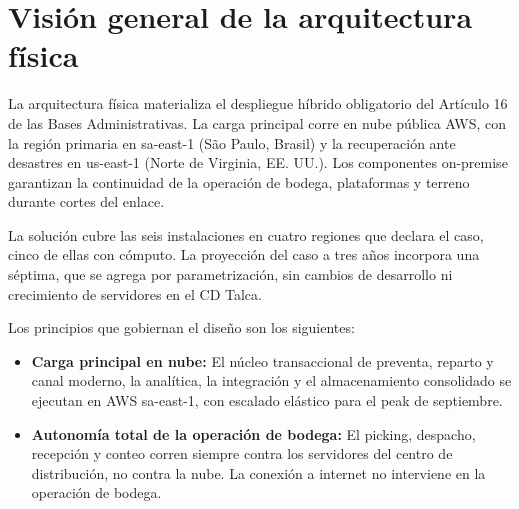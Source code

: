 
\chapter*{Visión general de la arquitectura física}
\label{sec:vision-general-de-la-arquitectura-fisica}

La arquitectura física materializa el despliegue híbrido obligatorio del Artículo 16\textdegree{} de las Bases Administrativas. La carga principal corre en nube pública AWS, con la región primaria en sa-east-1 (São Paulo, Brasil) y la recuperación ante desastres en us-east-1 (Norte de Virginia, EE. UU.). Los componentes on-premise garantizan la continuidad de la operación de bodega, plataformas y terreno durante cortes del enlace.

La solución cubre las seis instalaciones en cuatro regiones que declara el caso, cinco de ellas con cómputo. La proyección del caso a tres años incorpora una séptima, que se agrega por parametrización, sin cambios de desarrollo ni crecimiento de servidores en el CD Talca.

Los principios que gobiernan el diseño son los siguientes:

\begin{itemize}
  \item \textbf{Carga principal en nube:} El núcleo transaccional de preventa, reparto y canal moderno, la analítica, la integración y el almacenamiento consolidado se ejecutan en AWS sa-east-1, con escalado elástico para el peak de septiembre.
  \item \textbf{Autonomía total de la operación de bodega:} El picking, despacho, recepción y conteo corren siempre contra los servidores del centro de distribución, no contra la nube. La conexión a internet no interviene en la operación de bodega.
\end{itemize}


